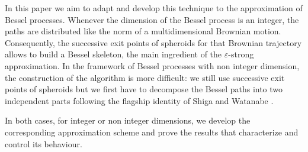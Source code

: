 \documentclass[12pt]{article}
\numberwithin{equation}{section}
\begin{document}
In this paper we aim to adapt and develop this technique to the approximation of Bessel processes. Whenever the dimension of the Bessel process is an integer, the paths are distributed like the norm of a multidimensional Brownian motion. Consequently, the successive exit points of spheroids for that Brownian trajectory allows to build a Bessel skeleton, the main ingredient of the $\varepsilon$-strong approximation. In the framework of Bessel processes with non integer dimension, the construction of the algorithm is more difficult: we still use successive exit points of spheroids but we first have to decompose the Bessel paths into two independent parts following the flagship identity of Shiga and Watanabe \cite{Shiga}.

In both cases, for integer or non integer dimensions, we develop the corresponding approximation scheme and prove the results that characterize and control its behaviour.
\end{document}
